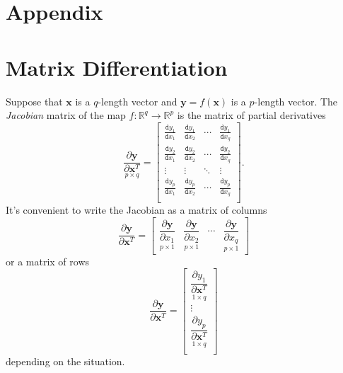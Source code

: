 \documentclass[graybox,envcountchap]{svmono}
\newcommand{\xf}{\mathbf{x}}
\newcommand{\yf}{\mathbf{y}}
\newcommand{\tx}{\texttt}
\begin{document}
\section{Appendix}

\section{Matrix Differentiation}
Suppose that $\xf$ is a $q$-length vector and $\yf = f(\xf)$ is a $p$-length vector.  The \emph{Jacobian} matrix of the map $f:\mathbb{R}^q \rightarrow\mathbb{R}^p$ is the matrix of partial derivatives 
\begin{equation}
\underset{p \times q} {\dfrac{ \partial \yf}{ \partial \xf^T}}  = \left[
 \begin{array}{cccc}
  \frac{\tx{d} y_1}{\tx{d}x_1} & \frac{\tx{d} y_1}{\tx{d}x_2} & \cdots & \frac{\tx{d} y_1}{\tx{d}x_q} \\
  \frac{\tx{d} y_2}{\tx{d}x_1} & \frac{\tx{d} y_2}{\tx{d}x_2} & \cdots & \frac{\tx{d} y_2}{\tx{d}x_q} \\
   \vdots &\vdots &  \ddots & \vdots \\
  \frac{\tx{d} y_p}{\tx{d}x_1}& \frac{\tx{d} y_p}{\tx{d}x_2}  & \cdots & \frac{\tx{d} y_p}{\tx{d}x_q} \\
 \end{array} \right].
\end{equation}
It's convenient to write the Jacobian as a matrix of columns
\begin{equation}
 \dfrac{ \partial \yf}{ \partial \xf^T}  = \left[
 \begin{array}{cccc}
  \underset{p \times 1}{\dfrac{\partial \yf }{\partial x_1}} & \underset{p \times 1}{\dfrac{\partial \yf}{\partial x_2}} & \cdots & \underset{p \times 1}{\dfrac{\partial \yf}{\partial x_q}} 
 \end{array} \right]
\end{equation}
or a matrix of rows
\begin{equation}
 \dfrac{ \partial \yf}{ \partial \xf^T}  = \left[
 \begin{array}{c}
  \underset{1 \times q}{\dfrac{\partial y_{ 1}}{\partial \xf^T}} \\
  \vdots \\
  \underset{1 \times q}{\dfrac{\partial y_p}{\partial \xf^T} }\\
 \end{array} \right]
\end{equation}
depending on the situation. 
\end{document}
